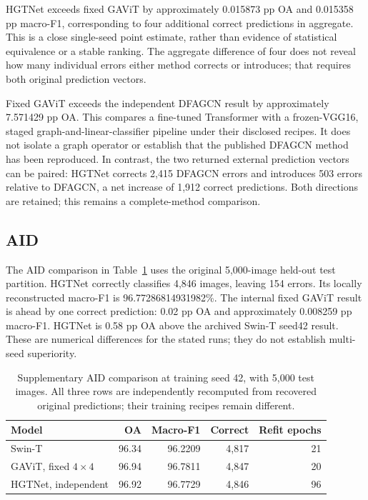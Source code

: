 HGTNet exceeds fixed GAViT by approximately 0.015873 pp OA and 0.015358 pp
macro-F1, corresponding to four additional correct predictions in aggregate.
This is a close single-seed point estimate, rather than evidence of
statistical equivalence or a stable ranking. The aggregate difference of
four does not reveal how many individual errors either method corrects or
introduces; that requires both original prediction vectors.

Fixed GAViT exceeds the independent DFAGCN result by approximately
7.571429 pp OA. This compares a fine-tuned Transformer with a frozen-VGG16,
staged graph-and-linear-classifier pipeline under their disclosed recipes.
It does not isolate a graph operator or establish that the published DFAGCN
method has been reproduced. In contrast, the two returned external
prediction vectors can be paired: HGTNet corrects 2,415 DFAGCN errors and
introduces 503 errors relative to DFAGCN, a net increase of 1,912 correct
predictions. Both directions are retained; this remains a complete-method
comparison.

\subsection{AID}

The AID comparison in Table~\ref{tab:external-aid} uses the original
5,000-image held-out test partition. HGTNet correctly classifies 4,846
images, leaving 154 errors. Its locally reconstructed macro-F1 is
96.77286814931982\%. The internal fixed GAViT result is ahead by one correct
prediction: 0.02 pp OA and approximately 0.008259 pp macro-F1. HGTNet is
0.58 pp OA above the archived Swin-T seed42 result. These are numerical
differences for the stated runs; they do not establish multi-seed superiority.

\begin{table}[tbp]
 \centering
 \caption{Supplementary AID comparison at training seed 42, with
 5,000 test images. All three rows are independently recomputed from
 recovered original predictions; their training recipes remain different.}
 \label{tab:external-aid}
 \small
 \setlength{\tabcolsep}{5pt}
 \begin{tabular}{lrrrr}
  \toprule
  Model & OA & Macro-F1 & Correct & Refit epochs\\
  \midrule
  Swin-T & 96.34 & 96.2209 & 4,817 & 21\\
  GAViT, fixed $4\times4$ & 96.94 & 96.7811 & 4,847 & 20\\
  HGTNet, independent & 96.92 & 96.7729 & 4,846 & 96\\
  \bottomrule
 \end{tabular}
\end{table}

